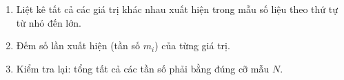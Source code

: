 \begin{enumerate}
\item Liệt kê tất cả các giá trị khác nhau xuất hiện trong mẫu số liệu theo thứ tự từ nhỏ đến lớn.
\item Đếm số lần xuất hiện (tần số $m_i$) của từng giá trị.
\item Kiểm tra lại: tổng tất cả các tần số phải bằng đúng cỡ mẫu $N$.
\end{enumerate}

